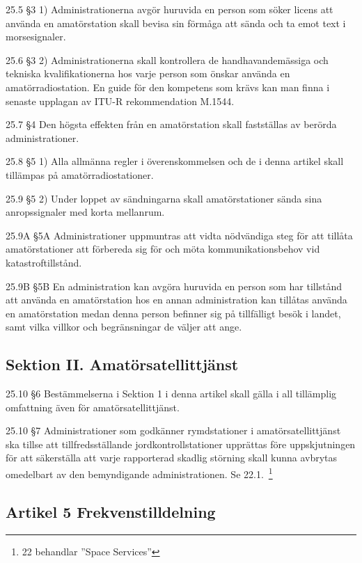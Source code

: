 25.5 \S3 1) Administrationerna avgör huruvida en person som söker licens
att använda en amatörstation skall bevisa sin förmåga att sända och ta
emot text i morsesignaler.
\cite[25.5]{ITU-RR}

25.6 \S3 2) Administrationerna skall kontrollera de handhavandemässiga och
tekniska kvalifikationerna hos varje person som önskar använda en
amatörradiostation. En guide för den kompetens som krävs kan man finna i
senaste upplagan av ITU-R rekommendation M.1544.
\cite[25.6]{ITU-RR}

25.7 \S4 Den högsta effekten från en amatörstation skall fastställas
av berörda administrationer.
\cite[25.7]{ITU-RR}

25.8 \S5 1) Alla allmänna regler i överenskommelsen och de i denna
artikel skall tillämpas på amatörradiostationer.
\cite[25.8]{ITU-RR}

25.9 \S5 2) Under loppet av sändningarna skall amatörstationer sända
sina anropssignaler med korta mellanrum.
\cite[25.9]{ITU-RR}

25.9A \S5A Administrationer uppmuntras att vidta nödvändiga steg för att
tillåta amatörstationer att förbereda sig för och möta kommunikationsbehov
vid katastroftillstånd.
\cite[25.9A]{ITU-RR}

25.9B \S5B En administration kan avgöra huruvida en person som har tillstånd
att använda en amatörstation hos en annan administration kan tillåtas använda
en amatörstation medan denna person befinner sig på tillfälligt besök i landet,
samt vilka villkor och begränsningar de väljer att ange.
\cite[25.9B]{ITU-RR}

\subsection{Sektion II. Amatörsatellittjänst}

25.10 \S6 Bestämmelserna i Sektion 1 i denna artikel skall gälla i all
tillämplig omfattning även för amatörsatellittjänst.
\cite[25.10]{ITU-RR}

25.10 \S7 Administrationer som godkänner rymdstationer i amatörsatellittjänst
ska tillse att tillfredsställande jordkontrollstationer upprättas före
uppskjutningen för att säkerställa att varje rapporterad skadlig störning
skall kunna avbrytas omedelbart av den bemyndigande administrationen.
Se 22.1.~\cite[25.11]{ITU-RR}\footnote{22 behandlar ''Space Services''}

\subsection{Artikel 5 Frekvenstilldelning}

